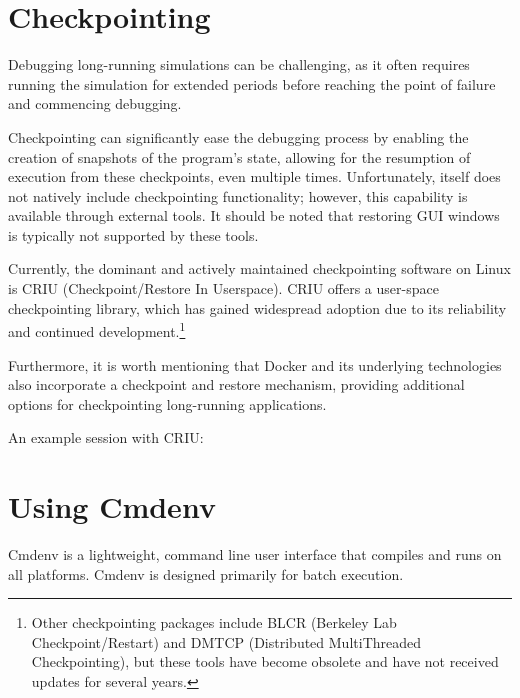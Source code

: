 \section{Checkpointing}
\label{sec:run-sim:checkpointing}

Debugging long-running simulations can be challenging, as it often requires
running the simulation for extended periods before reaching the point of failure
and commencing debugging.

Checkpointing can significantly ease the debugging process by enabling the
creation of snapshots of the program's state, allowing for the resumption of
execution from these checkpoints, even multiple times. Unfortunately, {\opp}
itself does not natively include checkpointing functionality; however, this
capability is available through external tools. It should be noted that
restoring GUI windows is typically not supported by these tools.

Currently, the dominant and actively maintained checkpointing software on Linux
is CRIU (Checkpoint/Restore In Userspace). CRIU offers a user-space
checkpointing library, which has gained widespread adoption due to its
reliability and continued development.\footnote{Other checkpointing packages
include BLCR (Berkeley Lab Checkpoint/Restart) and DMTCP (Distributed
MultiThreaded Checkpointing), but these tools have become obsolete and have not
received updates for several years.}

Furthermore, it is worth mentioning that Docker and its underlying technologies
also incorporate a checkpoint and restore mechanism, providing additional
options for checkpointing long-running applications.

An example session with CRIU:



\section{Using Cmdenv}
\label{sec:run-sim:cmdenv}

Cmdenv is a lightweight, command line user interface that
compiles and runs on all platforms. Cmdenv is designed primarily for batch
execution.

